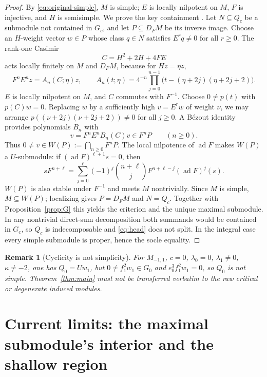 \documentclass[11pt,a4paper]{article}
\theoremstyle{upright}
\newtheorem{remark}[theorem]{Remark}
\DeclareMathOperator{\ad}{ad}
\begin{document}
\begin{proof}
By \eqref{eq:original-simple}, $M$ is simple; $E$ is locally nilpotent on
$M$, $F$ is injective, and $H$ is semisimple. We prove the key containment
\cite[Section 2]{Addendum}. Let $N\subseteq Q_c$ be a submodule not
contained in $G_c$, and let $P\subseteq D_FM$ be its inverse image. Choose an
$H$-weight vector $w\in P$ whose class $q\in N$ satisfies $E^rq\ne0$ for all
$r\ge0$. The rank-one Casimir
\[
C=H^2+2H+4FE
\]
acts locally finitely on $M$ and $D_FM$, because for $Hz=\eta z$,
\[
F^nE^nz=A_n(C;\eta)z,
\qquad A_n(t;\eta)=4^{-n}\prod_{j=0}^{n-1}
\bigl(t-(\eta+2j)(\eta+2j+2)\bigr).
\]
$E$ is locally nilpotent on $M$, and $C$ commutes with $F^{-1}$. Choose
$0\ne p(t)$ with $p(C)w=0$. Replacing $w$ by a sufficiently high $v=E^rw$
of weight $\nu$, we may arrange
$p((\nu+2j)(\nu+2j+2))\ne0$ for all $j\ge0$. A B\'ezout identity provides
polynomials $B_n$ with
\[
v=F^nE^nB_n(C)v\in F^nP\qquad(n\ge0).
\]
Thus $0\ne v\in W(P):=\bigcap_{n\ge0}F^nP$. The local nilpotence of $\ad F$
makes $W(P)$ a $U$-submodule: if $(\ad F)^{\ell+1}s=0$, then
\[
sF^{n+\ell}=\sum_{j=0}^{\ell}(-1)^j\binom{n+\ell}{j}
F^{n+\ell-j}(\ad F)^j(s).
\]
$W(P)$ is also stable under $F^{-1}$ and meets $M$ nontrivially. Since $M$
is simple, $M\subseteq W(P)$; localizing gives $P=D_FM$ and $N=Q_c$. Together
with Proposition~\ref{prop:G} this yields the criterion and the unique
maximal submodule. In any nontrivial direct-sum decomposition both summands
would be contained in $G_c$, so $Q_c$ is indecomposable and \eqref{eq:head}
does not split. In the integral case every simple submodule is proper, hence
the socle equality.
\end{proof}

\begin{remark}[Cyclicity is not simplicity]
For $M_{-1,1}$, $c=0$, $\lambda_0=0$, $\lambda_1\ne0$, $\kappa\ne-2$, one has
$Q_0=Uw_1$, but $0\ne f_1^2w_1\in G_0$ and $e_0^3f_1^2w_1=0$, so $Q_0$ is
not simple. Theorem~\ref{thm:main} must not be transferred verbatim to the
raw critical or degenerate induced modules.
\end{remark}

\section{Current limits: the maximal submodule's interior and the shallow region}
\end{document}
